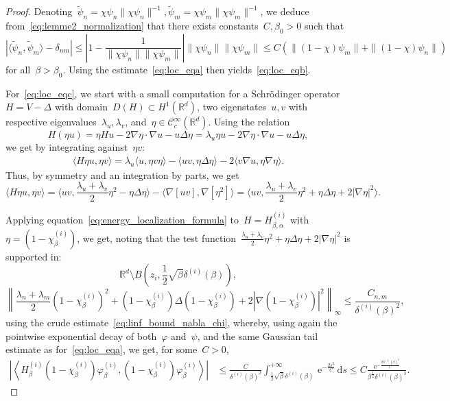 \documentclass[10pt]{article}
\renewcommand{\d}{\mathrm{d}}
\newcommand{\e}{\mathrm{e}}
\newcommand{\R}{\mathbb{R}}
\newcommand{\1}{\mathbbm 1}
\newcommand{\deltai}{\delta^{(i)}}
\begin{document}
\begin{proof}
       Denoting~$\widetilde \psi_n = \chi\psi_n\|\chi\psi_n\|^{-1}, \widetilde \psi_m = \chi\psi_m\|\chi\psi_m\|^{-1}$, we deduce from~\eqref{eq:lemme2_normalization} that
       there exists constants~$C,\beta_0>0$ such that 
       \[\left|\langle \widetilde \psi_n,\widetilde \psi_m\rangle -\delta_{nm}\right|\leq \left|1-\frac{1}{\|\chi\psi_n\|\|\chi\psi_m\|}\right|\|\chi\psi_n\|\|\chi\psi_m\|\leq C(\|(1-\chi)\psi_m\| + \|(1-\chi)\psi_n\|)\]
       for all~$\beta>\beta_0$. Using the estimate~\eqref{eq:loc_eqa} then yields~\eqref{eq:loc_eqb}.

        For~\eqref{eq:loc_eqc}, we start with a small computation for a Schrödinger operator~$H = V-\Delta$ with domain~$D(H)\subset H^1(\R^d)$, two eigenstates~$u,v$ with respective eigenvalues~$\lambda_u,\lambda_v$, and~$\eta\in\mathcal C_c^\infty(\R^d)$.
        Using the relation
        \[H(\eta u) = \eta H u - 2\nabla \eta\cdot \nabla u - u \Delta \eta = \lambda_u \eta u - 2 \nabla \eta \cdot \nabla u  - u \Delta \eta,\]
        we get by integrating against~$\eta v$:
            \begin{align*}
                \langle H\eta u,\eta v\rangle = \lambda_u\langle u,\eta v\eta\rangle - \langle uv,\eta\Delta\eta\rangle -2 \langle v\nabla u,\eta\nabla\eta\rangle.
            \end{align*}
            Thus, by symmetry and an integration by parts, we get
            \begin{equation}
                \label{eq:energy_localization_formula}
                \langle H\eta u,\eta v\rangle = \langle uv,\frac{\lambda_u+\lambda_v}2\eta^2-\eta\Delta\eta\rangle -\langle \nabla[uv],\nabla[\eta^2]\rangle = \langle uv,\frac{\lambda_u+\lambda_v}2\eta^2+\eta\Delta\eta + 2|\nabla\eta|^2\rangle.
            \end{equation}
        
        Applying equation~\eqref{eq:energy_localization_formula} to~$H = H_{\beta,\alpha}^{(i)}$ with~$\eta = (1-\chi_\beta^{(i)})$, we get, noting that the test function~$\frac{\lambda_u+\lambda_v}2\eta^2+\eta\Delta\eta + 2|\nabla\eta|^2$ is supported in:
        \[\R^d\setminus B\left(z_i,\frac12\sqrt\beta\deltai(\beta)\right),\]
        \[\left\|\frac{\lambda_n+\lambda_m}{2}(1-\chi_\beta^{(i)})^2+(1-\chi_\beta^{(i)})\Delta(1-\chi_\beta^{(i)}) + 2|\nabla(1-\chi_\beta^{(i)})|^2\right\|_{\infty}\leq \frac{C_{n,m}}{\deltai(\beta)^2},\]
        using the crude estimate~\eqref{eq:linf_bound_nabla_chi}, whereby, using again the pointwise exponential decay of both~$\varphi$ and~$\psi$, and the same Gaussian tail estimate as for~\eqref{eq:loc_eqa}, we get, for some~$C>0$,
        \begin{equation}
            \begin{aligned}
                \left|\left\langle H_\beta^{(i)}(1-\chi_\beta^{(i)})\varphi_\beta^{(i)},(1-\chi_\beta^{(i)})\varphi_\beta^{(i)}\right\rangle \right| &\leq \frac{C}{\deltai(\beta)^2}\int_{\frac12\sqrt\beta\deltai(\beta)}^{+\infty}\,\e^{-\frac{2s^2}{C}}\,\d s\leq C\frac{\e^{-\frac{\beta\deltai(\beta)^2}{C}}}{\beta^{\frac12}\delta^{(i)}(\beta)^3}.
            \end{aligned}
        \end{equation}


\end{proof}
\end{document}
